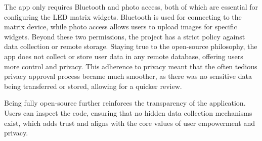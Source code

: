 The app only requires Bluetooth and photo access, both of which are essential for configuring the LED matrix widgets. Bluetooth is used for connecting to the matrix device, while photo access allows users to upload images for specific widgets. Beyond these two permissions, the project has a strict policy against data collection or remote storage. Staying true to the open-source philosophy, the app does not collect or store user data in any remote database, offering users more control and privacy. This adherence to privacy meant that the often tedious privacy approval process became much smoother, as there was no sensitive data being transferred or stored, allowing for a quicker review.

Being fully open-source further reinforces the transparency of the application. Users can inspect the code, ensuring that no hidden data collection mechanisms exist, which adds trust and aligns with the core values of user empowerment and privacy.